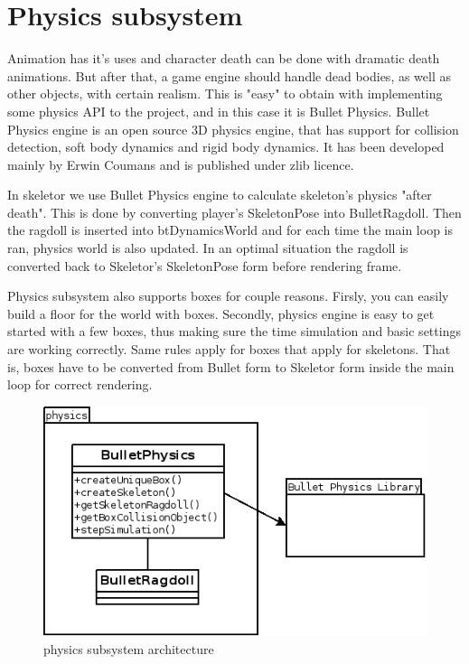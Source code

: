 \documentclass[11pt,twoside,a4paper]{article}
\begin{document}
\section{Physics subsystem}

Animation has it's uses and character death can be done with dramatic death animations. But after that, a game engine should handle dead bodies, as well as other objects, with certain realism. This is "easy" to obtain with implementing some physics API to the project, and in this case it is Bullet Physics. Bullet Physics engine is an open source 3D physics engine, that has support for collision detection, soft body dynamics and rigid body dynamics. It has been developed mainly by Erwin Coumans and is published under zlib licence.

In skeletor we use Bullet Physics engine to calculate skeleton's physics "after death". This is done by converting player's SkeletonPose into BulletRagdoll. Then the ragdoll is inserted into btDynamicsWorld and for each time the main loop is ran, physics world is also updated. In an optimal situation the ragdoll is converted back to Skeletor's SkeletonPose form before rendering frame.

Physics subsystem also supports boxes for couple reasons. Firsly, you can easily build a floor for the world with boxes. Secondly, physics engine is easy to get started with a few boxes, thus making sure the time simulation and basic settings are working correctly. Same rules apply for boxes that apply for skeletons. That is, boxes have to be converted from Bullet form to Skeletor form inside the main loop for correct rendering.

\begin{figure}
  \centering
    \includegraphics[scale=0.7]{physics_subsystem.png}
  \caption{physics subsystem architecture}
  \label{physicssubsys}
\end{figure}
\end{document}
